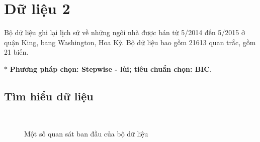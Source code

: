 \section{Dữ liệu 2}
Bộ dữ liệu ghi lại lịch sử về những ngôi nhà được bán từ 5/2014 đến 5/2015 ở quận King, bang Washington, Hoa Kỳ. Bộ dữ liệu bao gồm 21613 quan trắc, gồm 21 biến.

$*$ \textbf{Phương pháp chọn: Stepwise - lùi; tiêu chuẩn chọn: BIC}.

\subsection*{Tìm hiểu dữ liệu}
\begin{figure}[h!]
\centering
{}\\
\hfill
{}\hfill
\caption{Một số quan sát ban đầu của bộ dữ liệu}
\end{figure}

